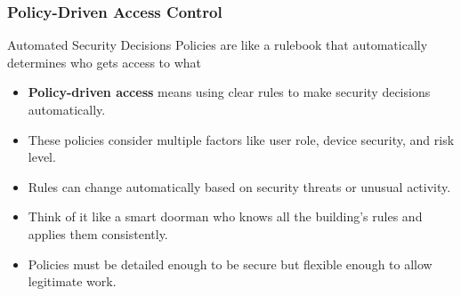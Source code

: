 \documentclass{beamer}
\begin{document}
\begin{frame}
    \frametitle{Policy-Driven Access Control}
    \begin{block}{Automated Security Decisions}
        Policies are like a rulebook that automatically determines who gets access to what
    \end{block}
    \begin{itemize}
        \item \textbf{Policy-driven access} means using clear rules to make security decisions automatically.
        \item These policies consider multiple factors like user role, device security, and risk level.
        \item Rules can change automatically based on security threats or unusual activity.
        \item Think of it like a smart doorman who knows all the building's rules and applies them consistently.
        \item Policies must be detailed enough to be secure but flexible enough to allow legitimate work.
    \end{itemize}
\end{frame}
\end{document}
